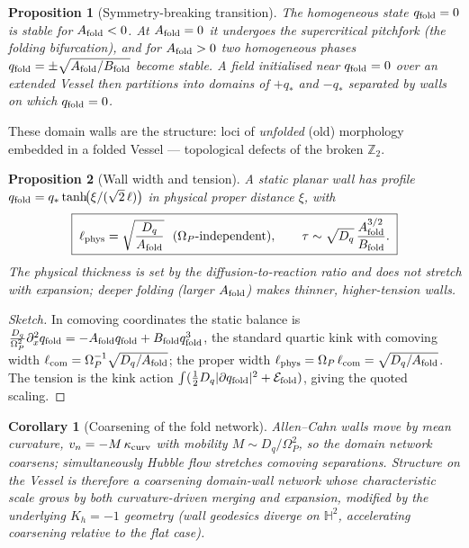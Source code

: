 \documentclass[11pt,a4paper]{article}
\newcommand{\Op}{\Omega_P}
\newcommand{\Hh}{\mathbb{H}^2}
\newcommand{\qf}{q_{\rm fold}}
\newcommand{\Af}{A_{\rm fold}}
\newcommand{\Bf}{B_{\rm fold}}
\theoremstyle{plain}
\newtheorem{proposition}{Proposition}[section]
\newtheorem{corollary}{Corollary}[section]
\theoremstyle{definition}
\theoremstyle{remark}
\begin{document}
\begin{proposition}[Symmetry-breaking transition]
The homogeneous state $\qf=0$ is stable for $\Af<0$. At $\Af=0$ it undergoes the supercritical pitchfork
(the folding bifurcation), and for $\Af>0$ two homogeneous phases $\qf=\pm\sqrt{\Af/\Bf}$ become stable.
A field initialised near $\qf=0$ over an extended Vessel then partitions into domains of $+q_\ast$ and
$-q_\ast$ separated by walls on which $\qf=0$.
\end{proposition}

These domain walls are the structure: loci of \emph{unfolded} (old) morphology embedded in a folded
Vessel --- topological defects of the broken $\mathbb Z_2$.

\begin{proposition}[Wall width and tension]
A static planar wall has profile $\qf=q_\ast\tanh\!\bigl(\xi/(\sqrt2\,\ell)\bigr)$ in physical proper
distance $\xi$, with
\begin{equation}
\boxed{\;\ell_{\rm phys}=\sqrt{\frac{D_q}{\Af}}\ \ (\Op\text{-independent}),
\qquad
\tau\sim\sqrt{D_q}\,\frac{\Af^{3/2}}{\Bf}.\;}
\end{equation}
The physical thickness is set by the diffusion-to-reaction ratio and does not stretch with expansion;
deeper folding (larger $\Af$) makes thinner, higher-tension walls.
\end{proposition}
\begin{proof}[Sketch]
In comoving coordinates the static balance is
$\tfrac{D_q}{\Op^2}\partial_x^2\qf=-\Af\qf+\Bf\qf^3$, the standard quartic kink with comoving width
$\ell_{\rm com}=\Op^{-1}\sqrt{D_q/\Af}$; the proper width $\ell_{\rm phys}=\Op\,\ell_{\rm com}=\sqrt{D_q/\Af}$.
The tension is the kink action $\int(\tfrac12 D_q|\partial\qf|^2+\mathcal E_{\rm fold})$, giving the
quoted scaling.
\end{proof}

\begin{corollary}[Coarsening of the fold network]
Allen--Cahn walls move by mean curvature, $v_n=-M\,\kappa_{\rm curv}$ with mobility $M\sim D_q/\Op^2$, so
the domain network coarsens; simultaneously Hubble flow stretches comoving separations. Structure on the
Vessel is therefore a \emph{coarsening domain-wall network} whose characteristic scale grows by both
curvature-driven merging and expansion, modified by the underlying $K_h=-1$ geometry (wall geodesics
diverge on $\Hh$, accelerating coarsening relative to the flat case).
\end{corollary}
\end{document}

